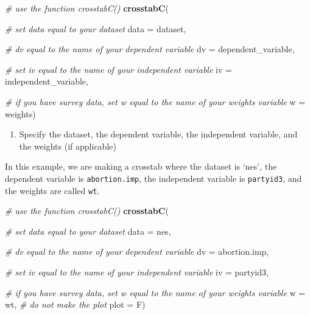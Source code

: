 \documentclass[
]{book}
\newenvironment{Shaded}{\begin{snugshade}}{\end{snugshade}}
\newcommand{\AttributeTok}[1]{\textcolor[rgb]{0.13,0.29,0.53}{#1}}
\newcommand{\CommentTok}[1]{\textcolor[rgb]{0.56,0.35,0.01}{\textit{#1}}}
\newcommand{\FunctionTok}[1]{\textcolor[rgb]{0.13,0.29,0.53}{\textbf{#1}}}
\newcommand{\NormalTok}[1]{#1}
\providecommand{\tightlist}{%
  \setlength{\itemsep}{0pt}\setlength{\parskip}{0pt}}
\begin{document}
\begin{Shaded}
\begin{Highlighting}[]
\CommentTok{\# use the function \textasciigrave{}crosstabC()}
\FunctionTok{crosstabC}\NormalTok{(}
  
  \CommentTok{\# set \textasciigrave{}data\textasciigrave{} equal to your dataset}
  \AttributeTok{data =}\NormalTok{ dataset,}
  
  \CommentTok{\# \textasciigrave{}dv\textasciigrave{} equal to the name of your dependent variable}
  \AttributeTok{dv =}\NormalTok{ dependent\_variable, }
  
  \CommentTok{\# set \textasciigrave{}iv\textasciigrave{} equal to the name of your independent variable}
  \AttributeTok{iv =}\NormalTok{ independent\_variable, }
  
  \CommentTok{\# if you have survey data, set \textasciigrave{}w\textasciigrave{} equal to the name of your weights variable}
  \AttributeTok{w =}\NormalTok{ weights)}
\end{Highlighting}
\end{Shaded}

\begin{enumerate}
\def\labelenumi{\arabic{enumi}.}
\setcounter{enumi}{3}
\tightlist
\item
  Specify the dataset, the dependent variable, the independent variable, and the weights (if applicable)
\end{enumerate}

In this example, we are making a crosstab where the dataset is `nes', the dependent variable is \texttt{abortion.imp}, the independent variable is \texttt{partyid3}, and the weights are called \texttt{wt}.

\begin{Shaded}
\begin{Highlighting}[]
\CommentTok{\# use the function \textasciigrave{}crosstabC()}
\FunctionTok{crosstabC}\NormalTok{(}
  
  \CommentTok{\# set \textasciigrave{}data\textasciigrave{} equal to your dataset}
  \AttributeTok{data =}\NormalTok{ nes,}
  
  \CommentTok{\# \textasciigrave{}dv\textasciigrave{} equal to the name of your dependent variable}
  \AttributeTok{dv =}\NormalTok{ abortion.imp, }
  
  \CommentTok{\# set \textasciigrave{}iv\textasciigrave{} equal to the name of your independent variable}
  \AttributeTok{iv =}\NormalTok{ partyid3, }
  
  \CommentTok{\# if you have survey data, set \textasciigrave{}w\textasciigrave{} equal to the name of your weights variable}
  \AttributeTok{w =}\NormalTok{ wt,}
  \CommentTok{\# do not make the plot}
  \AttributeTok{plot =}\NormalTok{ F)}
\end{Highlighting}
\end{Shaded}
\end{document}
